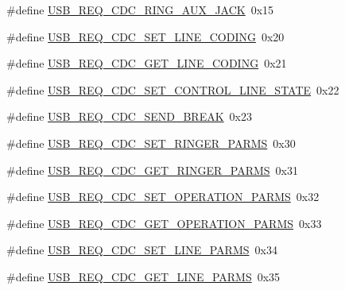 \begin{DoxyCompactItemize}
\item 
\#define \hyperlink{group__cdc__protocol__group_ga2373fab42c699e4ed789b88a3755255a}{\-U\-S\-B\-\_\-\-R\-E\-Q\-\_\-\-C\-D\-C\-\_\-\-R\-I\-N\-G\-\_\-\-A\-U\-X\-\_\-\-J\-A\-C\-K}~0x15
\item 
\#define \hyperlink{group__cdc__protocol__group_ga4e36b0b1795b8fb8d47f0864fbc50120}{\-U\-S\-B\-\_\-\-R\-E\-Q\-\_\-\-C\-D\-C\-\_\-\-S\-E\-T\-\_\-\-L\-I\-N\-E\-\_\-\-C\-O\-D\-I\-N\-G}~0x20
\item 
\#define \hyperlink{group__cdc__protocol__group_ga4225199eaffc265eb87f5fd50729428b}{\-U\-S\-B\-\_\-\-R\-E\-Q\-\_\-\-C\-D\-C\-\_\-\-G\-E\-T\-\_\-\-L\-I\-N\-E\-\_\-\-C\-O\-D\-I\-N\-G}~0x21
\item 
\#define \hyperlink{group__cdc__protocol__group_ga5095b668106c8843dda529f539e0eed1}{\-U\-S\-B\-\_\-\-R\-E\-Q\-\_\-\-C\-D\-C\-\_\-\-S\-E\-T\-\_\-\-C\-O\-N\-T\-R\-O\-L\-\_\-\-L\-I\-N\-E\-\_\-\-S\-T\-A\-T\-E}~0x22
\item 
\#define \hyperlink{group__cdc__protocol__group_ga7cba4467d40cd6532019864a7d068c8d}{\-U\-S\-B\-\_\-\-R\-E\-Q\-\_\-\-C\-D\-C\-\_\-\-S\-E\-N\-D\-\_\-\-B\-R\-E\-A\-K}~0x23
\item 
\#define \hyperlink{group__cdc__protocol__group_gaacab4e30847dde3f01d792290ebea666}{\-U\-S\-B\-\_\-\-R\-E\-Q\-\_\-\-C\-D\-C\-\_\-\-S\-E\-T\-\_\-\-R\-I\-N\-G\-E\-R\-\_\-\-P\-A\-R\-M\-S}~0x30
\item 
\#define \hyperlink{group__cdc__protocol__group_gafb80f6a095d4508e211ed5e775b2c500}{\-U\-S\-B\-\_\-\-R\-E\-Q\-\_\-\-C\-D\-C\-\_\-\-G\-E\-T\-\_\-\-R\-I\-N\-G\-E\-R\-\_\-\-P\-A\-R\-M\-S}~0x31
\item 
\#define \hyperlink{group__cdc__protocol__group_gad3375aed1f7a5e7df4685126d66f09b6}{\-U\-S\-B\-\_\-\-R\-E\-Q\-\_\-\-C\-D\-C\-\_\-\-S\-E\-T\-\_\-\-O\-P\-E\-R\-A\-T\-I\-O\-N\-\_\-\-P\-A\-R\-M\-S}~0x32
\item 
\#define \hyperlink{group__cdc__protocol__group_ga69f047ea3ec9e3a356ff005a81a6dbad}{\-U\-S\-B\-\_\-\-R\-E\-Q\-\_\-\-C\-D\-C\-\_\-\-G\-E\-T\-\_\-\-O\-P\-E\-R\-A\-T\-I\-O\-N\-\_\-\-P\-A\-R\-M\-S}~0x33
\item 
\#define \hyperlink{group__cdc__protocol__group_ga3683e27c05ec1d65d1a22a014b665792}{\-U\-S\-B\-\_\-\-R\-E\-Q\-\_\-\-C\-D\-C\-\_\-\-S\-E\-T\-\_\-\-L\-I\-N\-E\-\_\-\-P\-A\-R\-M\-S}~0x34
\item 
\#define \hyperlink{group__cdc__protocol__group_gafe2f2f77e0f6fa768d3fae25131ef7fb}{\-U\-S\-B\-\_\-\-R\-E\-Q\-\_\-\-C\-D\-C\-\_\-\-G\-E\-T\-\_\-\-L\-I\-N\-E\-\_\-\-P\-A\-R\-M\-S}~0x35
\item 

\end{DoxyCompactItemize}
